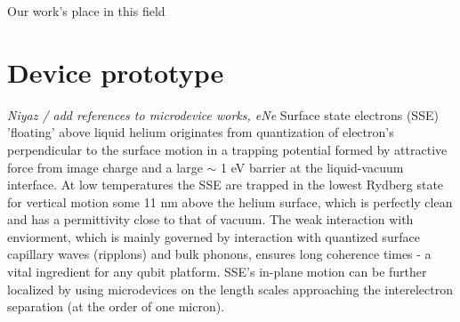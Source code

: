 \documentclass[twocolumn,superscriptaddress,unsortedaddress,
 amsmath,amssymb,
 aps,
]{revtex4-2}
\begin{document}
Our work's place in this field


\section{Device prototype}\label{sec:device} %
\textit{Niyaz / add references to microdevice works, eNe} Surface state electrons (SSE) 'floating' above liquid helium originates from quantization of electron's perpendicular to the surface motion in a trapping potential formed by attractive force from image charge and a large $\sim$ 1 eV barrier at the liquid-vacuum interface. At low temperatures the SSE are trapped in the lowest Rydberg state for vertical motion some 11 nm above the helium surface, which is perfectly clean and has a permittivity close to that of vacuum. The weak interaction with enviorment, which is mainly governed by interaction with quantized surface capillary waves (ripplons) and bulk phonons, ensures long coherence times - a vital ingredient for any qubit platform. SSE's in-plane motion can be further localized by using microdevices on the length scales approaching the interelectron separation (at the order of one micron).
\end{document}
